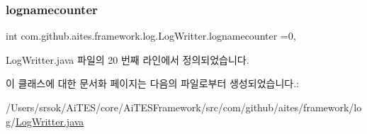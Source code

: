 \subsubsection{\texorpdfstring{lognamecounter}{lognamecounter}}
{\footnotesize\ttfamily int com.\+github.\+aites.\+framework.\+log.\+Log\+Writter.\+lognamecounter =0\hspace{0.3cm}{\ttfamily [static]}, {\ttfamily [private]}}



Log\+Writter.\+java 파일의 20 번째 라인에서 정의되었습니다.



이 클래스에 대한 문서화 페이지는 다음의 파일로부터 생성되었습니다.\+:\begin{DoxyCompactItemize}
\item 
/\+Users/srsok/\+Ai\+T\+E\+S/core/\+Ai\+T\+E\+S\+Framework/src/com/github/aites/framework/log/\mbox{\hyperlink{_log_writter_8java}{Log\+Writter.\+java}}\end{DoxyCompactItemize}
